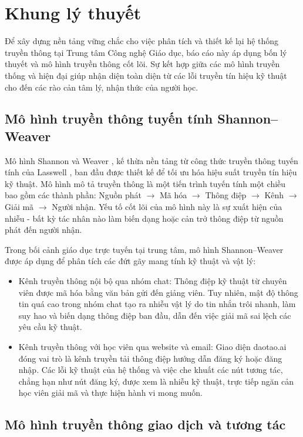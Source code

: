 \section{Khung lý thuyết}

Để xây dựng nền tảng vững chắc cho việc phân tích và thiết kế lại hệ thống truyền thông tại Trung tâm Công nghệ Giáo dục, báo cáo này áp dụng bốn lý thuyết và mô hình truyền thông cốt lõi. Sự kết hợp giữa các mô hình truyền thống và hiện đại giúp nhận diện toàn diện từ các lỗi truyền tín hiệu kỹ thuật cho đến các rào cản tâm lý, nhận thức của người học.

\subsection{Mô hình truyền thông tuyến tính Shannon–Weaver}

Mô hình Shannon và Weaver \parencite{shannon1949}, kế thừa nền tảng từ công thức truyền thông tuyến tính của Lasswell \parencite{lasswell1948}, ban đầu được thiết kế để tối ưu hóa hiệu suất truyền tín hiệu kỹ thuật. Mô hình mô tả truyền thông là một tiến trình tuyến tính một chiều bao gồm các thành phần: Nguồn phát $\rightarrow$ Mã hóa $\rightarrow$ Thông điệp $\rightarrow$ Kênh $\rightarrow$ Giải mã $\rightarrow$ Người nhận. Yếu tố cốt lõi của mô hình này là sự xuất hiện của nhiễu - bất kỳ tác nhân nào làm biến dạng hoặc cản trở thông điệp từ nguồn phát đến người nhận.

Trong bối cảnh giáo dục trực tuyến tại trung tâm, mô hình Shannon–Weaver được áp dụng để phân tích các đứt gãy mang tính kỹ thuật và vật lý:
\begin{itemize}
    \item Kênh truyền thông nội bộ qua nhóm chat: Thông điệp kỹ thuật từ chuyên viên được mã hóa bằng văn bản gửi đến giảng viên. Tuy nhiên, mật độ thông tin quá cao trong nhóm chat tạo ra nhiễu vật lý do tin nhắn trôi nhanh, làm suy hao và biến dạng thông điệp ban đầu, dẫn đến việc giải mã sai lệch các yêu cầu kỹ thuật.
    \item Kênh truyền thông với học viên qua website và email: Giao diện daotao.ai đóng vai trò là kênh truyền tải thông điệp hướng dẫn đăng ký hoặc đăng nhập. Các lỗi kỹ thuật của hệ thống và việc che khuất các nút tương tác, chẳng hạn như nút đăng ký, được xem là nhiễu kỹ thuật, trực tiếp ngăn cản học viên giải mã và thực hiện hành vi mong muốn.
\end{itemize}

\subsection{Mô hình truyền thông giao dịch và tương tác}

